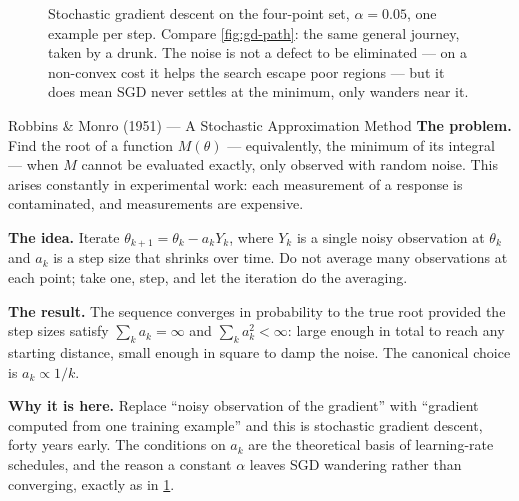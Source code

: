 \begin{figure}[htbp]
  \centering
  \caption{Stochastic gradient descent on the four-point set, $\alpha=0.05$, one
  example per step. Compare \cref{fig:gd-path}: the same general journey, taken
  by a drunk. The noise is not a defect to be eliminated --- on a non-convex
  cost it helps the search escape poor regions --- but it does mean SGD never
  settles at the minimum, only wanders near it.}
  \label{fig:sgd-path}
\end{figure}

\begin{researchspotlight}{Robbins \& Monro (1951) --- A Stochastic Approximation Method}
\textbf{The problem.} Find the root of a function $M(\theta)$ --- equivalently,
the minimum of its integral --- when $M$ cannot be evaluated exactly, only
observed with random noise. This arises constantly in experimental work: each
measurement of a response is contaminated, and measurements are expensive.

\textbf{The idea.} Iterate $\theta_{k+1} = \theta_k - a_k Y_k$, where $Y_k$ is a
single noisy observation at $\theta_k$ and $a_k$ is a step size that shrinks over
time. Do not average many observations at each point; take one, step, and let
the iteration do the averaging.

\textbf{The result.} The sequence converges in probability to the true root
provided the step sizes satisfy $\sum_k a_k = \infty$ and $\sum_k a_k^2 <
\infty$: large enough in total to reach any starting distance, small enough in
square to damp the noise. The canonical choice is $a_k \propto 1/k$.

\textbf{Why it is here.} Replace ``noisy observation of the gradient'' with
``gradient computed from one training example'' and this is stochastic gradient
descent, forty years early. The conditions on $a_k$ are the theoretical basis of
learning-rate schedules, and the reason a constant $\alpha$ leaves SGD wandering
rather than converging, exactly as in \cref{fig:sgd-path}.
\parencite{robbins1951}
\end{researchspotlight}

